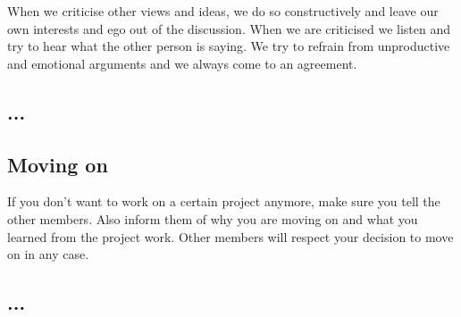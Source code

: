  	When we criticise other views and ideas, we do so constructively and leave our own interests and ego out of the discussion. 
 	When we are criticised we listen and try to hear what the other person is saying. 
 	We try to refrain from unproductive and emotional arguments and we always come to an agreement.


\french
	\subsection{...}


\english
	\subsection{Moving on}
	If you don't want to work on a certain project anymore, make sure you tell the other members. Also inform them of why you are moving on and what you learned from the project work. Other members will respect your decision to move on in any case.

\french
	\subsection{...}


